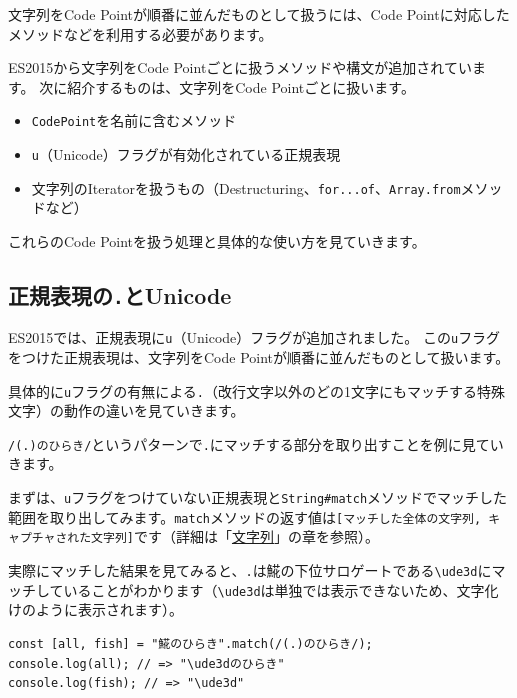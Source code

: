 文字列をCode Pointが順番に並んだものとして扱うには、Code
Pointに対応したメソッドなどを利用する必要があります。

ES2015から文字列をCode Pointごとに扱うメソッドや構文が追加されています。
次に紹介するものは、文字列をCode Pointごとに扱います。

\begin{itemize}
\item
  \texttt{CodePoint}を名前に含むメソッド
\item
  \texttt{u}（Unicode）フラグが有効化されている正規表現
\item
  文字列のIteratorを扱うもの（Destructuring、\texttt{for...of}、\texttt{Array.from}メソッドなど）
\end{itemize}

これらのCode Pointを扱う処理と具体的な使い方を見ていきます。

\hypertarget{regexp-unicode}{%
\subsection{\texorpdfstring{正規表現の\texttt{.}とUnicode}{正規表現の.とUnicode}}\label{regexp-unicode}}

ES2015では、正規表現に\texttt{u}（Unicode）フラグが追加されました。
この\texttt{u}フラグをつけた正規表現は、文字列をCode
Pointが順番に並んだものとして扱います。

具体的に\texttt{u}フラグの有無による\texttt{.}（改行文字以外のどの1文字にもマッチする特殊文字）の動作の違いを見ていきます。

\texttt{/(.)のひらき/}というパターンで\texttt{.}にマッチする部分を取り出すことを例に見ていきます。

まずは、\texttt{u}フラグをつけていない正規表現と\texttt{String\#match}メソッドでマッチした範囲を取り出してみます。\texttt{match}メソッドの返す値は\texttt{[マッチした全体の文字列, キャプチャされた文字列]}です（詳細は「\hyperlink{string}{文字列}」の章を参照）。

実際にマッチした結果を見てみると、\texttt{.}は𩸽の下位サロゲートである\texttt{\textbackslash ude3d}にマッチしていることがわかります（\texttt{\textbackslash ude3d}は単独では表示できないため、文字化けのように表示されます）。

\begin{lstlisting}
const [all, fish] = "𩸽のひらき".match(/(.)のひらき/);
console.log(all); // => "\ude3dのひらき"
console.log(fish); // => "\ude3d"
\end{lstlisting}

